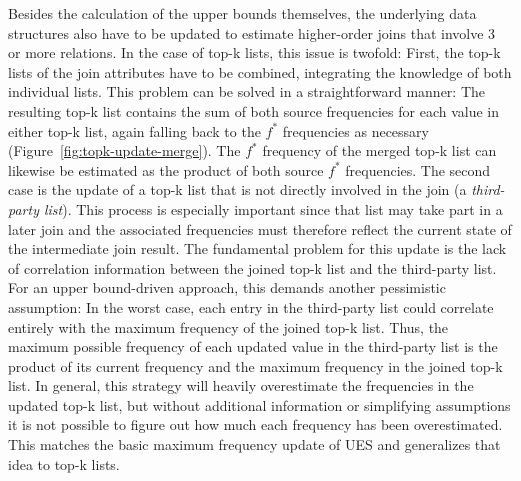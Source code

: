 Besides the calculation of the upper bounds themselves, the underlying data structures also have to be updated to estimate higher-order joins that involve 3 or more relations. 
In the case of top-k lists, this issue is twofold: First, the top-k lists of the join attributes have to be combined, integrating the knowledge of both individual lists. 
This problem can be solved in a straightforward manner: The resulting top-k list contains the sum of both source frequencies for each value in either top-k list, again falling back to the $f^\ast$ frequencies as necessary (Figure~\ref{fig:topk-update-merge}). 
The $f^\ast$ frequency of the merged top-k list can likewise be estimated as the product of both source $f^\ast$ frequencies. 
The second case is the update of a top-k list that is not directly involved in the join (a \emph{third-party list}). 
This process is especially important since that list may take part in a later join and the associated frequencies must therefore reflect the current state of the intermediate join result. 
The fundamental problem for this update is the lack of correlation information between the joined top-k list and the third-party list. 
For an upper bound-driven approach, this demands another pessimistic assumption: In the worst case, each entry in the third-party list could correlate entirely with the maximum frequency of the joined top-k list. 
Thus, the maximum possible frequency of each updated value in the third-party list is the product of its current frequency and the maximum frequency in the joined top-k list. 
In general, this strategy will heavily overestimate the frequencies in the updated top-k list, but without additional information or simplifying assumptions it is not possible to figure out how much each frequency has been overestimated. 
This matches the basic maximum frequency update of UES and generalizes that idea to top-k lists.
